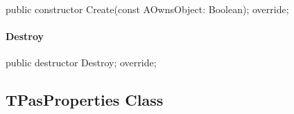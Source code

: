 \documentclass{report}
\newif\ifpdf
\begin{document}
\label{PasDoc_Items.TPasRoutines-Create}
\begin{list}{}{
\setlength{\itemindent}{0cm}
\setlength{\listparindent}{0cm}
\setlength{\leftmargin}{\evensidemargin}
\addtolength{\leftmargin}{\tmplength}
\settowidth{\labelsep}{X}
\addtolength{\leftmargin}{\labelsep}
\setlength{\labelwidth}{\tmplength}
}
\item[\textbf{Declaration}\hfill]
\ifpdf
\begin{flushleft}
\fi
\begin{ttfamily}
public constructor Create(const AOwnsObject: Boolean); override;\end{ttfamily}

\ifpdf
\end{flushleft}
\fi

\end{list}
\paragraph*{Destroy}\hspace*{\fill}

\label{PasDoc_Items.TPasRoutines-Destroy}
\begin{list}{}{
\setlength{\itemindent}{0cm}
\setlength{\listparindent}{0cm}
\setlength{\leftmargin}{\evensidemargin}
\addtolength{\leftmargin}{\tmplength}
\settowidth{\labelsep}{X}
\addtolength{\leftmargin}{\labelsep}
\setlength{\labelwidth}{\tmplength}
}
\item[\textbf{Declaration}\hfill]
\ifpdf
\begin{flushleft}
\fi
\begin{ttfamily}
public destructor Destroy; override;\end{ttfamily}

\ifpdf
\end{flushleft}
\fi

\end{list}
\ifpdf
\subsection*{\large{\textbf{TPasProperties Class}}\normalsize\hspace{1ex}\hrulefill}
\else
\subsection*{TPasProperties Class}
\fi
\label{PasDoc_Items.TPasProperties}
\end{document}
